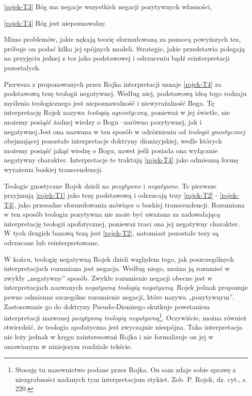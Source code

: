 \noindent \eqref{rojek-T3} Bóg ma negacje wszystkich negacji pozytywnych własności,

\noindent \eqref{rojek-T4} Bóg jest niepoznawalny.


\bigskip

Mimo problemów, jakie nękają teorię sformułowaną za pomocą powyższych
tez, próbuje on podać kilka jej spójnych modeli. Strategie, jakie
przedstawia polegają na przyjęciu jednej z tez jako podstawowej i
odrzuceniu bądź reinterpretacji pozostałych.

Pierwsza z proponowanych przez Rojka interpretacji uznaje \eqref{rojek-T4} za
podstawową tezę teologii negatywnej. Według niej, podstawową ideą tego
rodzaju myślenia teologicznego jest niepoznawalność i niewyrażalność
Boga. Tę interpretację Rojek nazywa \textit{teologią agnostyczną},
ponieważ w jej świetle, nie możemy posiąść żadnej wiedzy o Bogu
–zarówno pozytywnej, jak i negatywnej.Jest ona nazwana w ten sposób w
odróżnieniu od \textit{teologii gnostycznej} obejmującej pozostałe
interpretacje doktryny dionizyjskiej, wedle których możemy posiąść
jakąś wiedzę o Bogu, nawet jeśli posiada ona wyłącznie negatywny
charakter. Interpretacje te traktują \eqref{rojek-T4} jako odmienną formę wyrażenia
boskiej transcendencji.

Teologie gnostyczne Rojek dzieli na \textit{pozytywne} i
\textit{negatywne}. Te pierwsze przyjmują \eqref{rojek-T1} jako tezę podstawową i
odrzucają tezy \eqref{rojek-T2} - \eqref{rojek-T4}, jako przesadne sformułowania mówiące o
boskiej transcendencji. Rozumiana w ten sposób teologia pozytywna nie
może być uważana za zadowalającą interpretację teologii apofatycznej,
ponieważ traci ona jej negatywny charakter. W tych drugich bazową tezą
jest \eqref{rojek-T2}, natomiast pozostałe tezy są odrzucane lub reinterpretowane.

W końcu, teologię negatywną Rojek dzieli względem tego, jak
poszczególnych interpretacjach rozumiana jest negacja. Według niego,
można ją rozumieć w zwykły „negatywny” sposób. Zwykłe rozumienie
negacji obecne jest w interpretacjach nazwanych \textit{negatywną
teologią negatywną}. Rojek jednak proponuje pewne odmienne szczególne
rozumienie negacji, które nazywa „pozytywnym”. Zastosowanie go do
doktryny Pseudo-Dionizego skutkuje powstaniem interpretacji nazwanej
\textit{pozytywną teologią negatywną}\footnote{Stosuję tu nazewnictwo
podane przez Rojka. On sam zdaje sobie sprawę z niezgrabności nadanych
tym interpretacjom etykiet. Zob. P. Rojek, dz. cyt., s. 220. }.
Oczywiście, można również stwierdzić, że teologia apofatyczna jest
zwyczajnie niespójna. Taka interpretacja nie leży jednak w kręgu
zainteresowań Rojka i nie formalizuje on jej w omawianym w niniejszym
rozdziale tekście.


